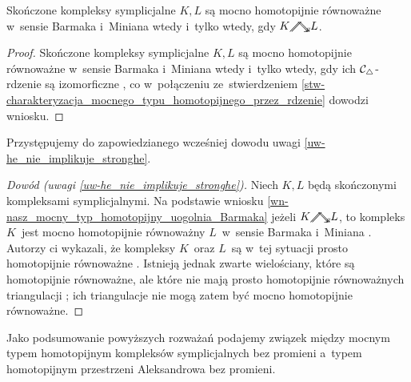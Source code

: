 
\begin{wn}\label{wn-nasz_mocny_typ_homotopijny_uogolnia_Barmaka}
Skończone kompleksy symplicjalne $K, L$ są mocno homotopijnie równoważne w~sensie Barmaka i~Miniana \cite[Definition 2.1]{Barmak12} wtedy i~tylko wtedy, gdy $K\stronghe L$. 
\end{wn}
\begin{proof}
Skończone kompleksy symplicjalne $K, L$ są mocno homotopijnie równoważne w~sensie Barmaka i~Miniana wtedy i~tylko wtedy, gdy ich $\mathcal{C}_\triangle$-rdzenie są izomorficzne \cite[Theorem 2.11]{Barmak12}, co w~połączeniu ze~stwierdzeniem \ref{stw-charakteryzacja_mocnego_typu_homotopijnego_przez_rdzenie} dowodzi wniosku.
\end{proof}

Przystępujemy do zapowiedzianego wcześniej dowodu uwagi \ref{uw-he_nie_implikuje_stronghe}.
\begin{proof}[Dowód (uwagi \ref{uw-he_nie_implikuje_stronghe})]\label{dowod-uw-he_nie_implikuje_stronghe}
Niech $K,L$ będą skończonymi kompleksami symplicjalnymi. Na podstawie wniosku \ref{wn-nasz_mocny_typ_homotopijny_uogolnia_Barmaka} jeżeli $K\stronghe L$, to kompleks $K$~jest mocno homotopijnie równoważny $L$~w~sensie Barmaka i~Miniana \cite[Definition 2.1]{Barmak12}. Autorzy ci wykazali, że kompleksy $K$~oraz $L$~są w~tej sytuacji prosto homotopijnie równoważne \cite[Proposition 2.15]{Barmak12}. Istnieją jednak zwarte wielościany, które są homotopijnie równoważne, ale które nie mają prosto homotopijnie równoważnych triangulacji \cite[(24.4)]{Cohen73}; ich triangulacje nie mogą zatem być mocno homotopijnie równoważne.
\end{proof} 

Jako podsumowanie powyższych rozważań podajemy związek między mocnym typem homotopijnym kompleksów symplicjalnych bez promieni a~typem homotopijnym przestrzeni Aleksandrowa bez promieni.

